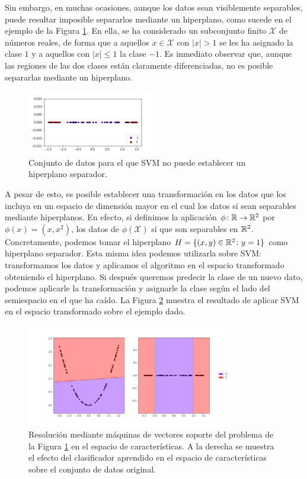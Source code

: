 Sin embargo, en muchas ocasiones, aunque los datos sean visiblemente separables, puede resultar imposible separarlos mediante un hiperplano, como sucede en el ejemplo de la Figura \ref{fig:svm_ejemplo2}. En ella, se ha considerado un subconjunto finito $\mathcal{X}$ de números reales, de forma que a aquellos $x \in \mathcal{X}$ con $|x| > 1$ se les ha asignado la clase $1$ y a aquellos con $|x| \le 1$ la clase $-1$. Es inmediato observar que, aunque las regiones de las dos clases están claramente diferenciadas, no es posible separarlas mediante un hiperplano.

\begin{figure}[h]
    \centering
    \includegraphics[width=0.5\textwidth]{images/svm_problem.png}
    \caption{Conjunto de datos para el que SVM no puede establecer un hiperplano separador.} \label{fig:svm_ejemplo2}
\end{figure} 

A pesar de esto, es posible establecer una transformación en los datos que los incluya en un espacio de dimensión mayor en el cual los datos sí sean separables mediante hiperplanos. En efecto, si definimos la aplicación $\phi\colon \mathbb{R} \to \mathbb{R}^2$ por $\phi(x) = (x,x^2)$, los datos de $\phi(\mathcal{X})$ sí que son separables en $\mathbb{R}^2$. Concretamente, podemos tomar el hiperplano $H = \{(x,y) \in \mathbb{R}^2 \colon y = 1\}$ como hiperplano separador. Esta misma idea podemos utilizarla sobre SVM: transformamos los datos y aplicamos el algoritmo en el espacio transformado obteniendo el hiperplano. Si después queremos predecir la clase de un nuevo dato, podemos aplicarle la transformación y asignarle la clase según el lado del semiespacio en el que ha caído. La Figura \ref{fig:svm_ejemplo3} muestra el resultado de aplicar SVM en el espacio transformado sobre el ejemplo dado.

\begin{figure}[h]
    \includegraphics[width=0.8\textwidth]{images/svm_solution.png}
    \centering
    \caption{Resolución mediante máquinas de vectores soporte del problema de la Figura \ref{fig:svm_ejemplo2} en el espacio de características. A la derecha se muestra el efecto del clasificador aprendido en el espacio de características sobre el conjunto de datos original.} \label{fig:svm_ejemplo3}
\end{figure} 

